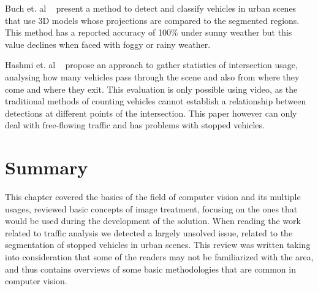 Buch et. al ~\cite{buch_detection_2008} present a method to detect and classify vehicles in urban scenes that use 3D models whose projections are compared to the segmented regions. This method has a reported accuracy of 100\% under sunny weather but this value declines when faced with foggy or rainy weather.

Hashmi et. al ~\cite{hashmi_analysis_2012} propose an approach to gather statistics of intersection usage, analysing how many vehicles pass through the scene and also from where they come and where they exit. This evaluation is only possible using video, as the traditional methods of counting vehicles cannot establish a relationship between detections at different points of the intersection. This paper however can only deal with free-flowing traffic and has problems with stopped vehicles.

\section{Summary}

This chapter covered the basics of the field of computer vision and its multiple usages, reviewed basic concepts of image treatment, focusing on the ones that would be used during the development of the solution. When reading the work related to traffic analysis we detected a largely unsolved issue, related to the segmentation of stopped vehicles in urban scenes. This review was written taking into consideration that some of the readers may not be familiarized with the area, and thus contains overviews of some basic methodologies that are common in computer vision.